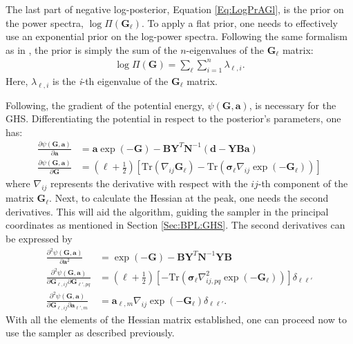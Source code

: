 \qquad The last part of negative log-posterior, Equation \eqref{Eq:LogPrAGl}, is the prior on the power spectra, $\log\Pi(\bm{G}_{\ell})$. To apply a flat prior, one needs to effectively use an exponential prior on the log-power spectra. Following the same formalism as in \cite{Taylor2008,SreeThesis}, the prior is simply the sum of the $n$-eigenvalues of the $\mathbf{G}_{\ell}$ matrix:
\begin{align}
\label{Eq:LogPiorGl}
\log\Pi(\mathbf{G}) = \sum_{\ell}\sum_{i=1}^n\lambda_{\ell,i}.
\end{align}
Here, $\lambda_{{\ell},i}$ is the \textit{i}-th eigenvalue of the $\mathbf{G}_{\ell}$ matrix.

\qquad Following, the gradient of the potential energy, $\psi(\mathbf{G},\mathbf{a})$, is necessary for the GHS. Differentiating the potential in respect to the posterior's parameters, one has:
\begin{align}
    \frac{\partial\psi(\mathbf{G},\mathbf{a})}{\partial\mathbf{a}} & = \mathbf{a}\exp(-\mathbf{G}) - \mathbf{B}\mathbf{Y}^T\mathbf{N}^{-1}(\mathbf{d}-\mathbf{Y}\mathbf{B}\mathbf{a}) \\
    \frac{\partial\psi(\mathbf{G},\mathbf{a})}{\partial\mathbf{G}} & = \left( {\ell}+\frac{1}{2}\right)\left[\mathrm{Tr}(\nabla_{ij}\mathbf{G}_{\ell}) -\mathrm{Tr}(\boldsymbol{\sigma}_{\ell}\nabla_{ij}\exp(-\mathbf{G}_{\ell})) \right]
\end{align}
where $\nabla_{ij}$ represents the derivative with respect with the $ij$-th component of the matrix $\mathbf{G}_{\ell}$. Next, to calculate the Hessian at the peak, one needs the second derivatives. This will aid the algorithm, guiding the sampler in the principal coordinates as mentioned in Section \ref{Sec:BPL:GHS}. The second derivatives can be expressed by
\begin{align}
    \frac{\partial^2\psi(\mathbf{G},\mathbf{a})}{\partial\mathbf{a}^2} & = \exp(-\mathbf{G}) - \mathbf{B}\mathbf{Y}^T\mathbf{N}^{-1}\mathbf{Y}\mathbf{B} \\\label{Eq:BPL:HessianAlms}
    \frac{\partial^2\psi(\mathbf{G},\mathbf{a})}{\partial\mathbf{G}_{\ell,ij}\partial\mathbf{G}_{\ell',pq}} & = \left( {\ell}+\frac{1}{2}\right)\left[-\mathrm{Tr}(\boldsymbol{\sigma}_{\ell}\nabla^2_{ij,pq} \exp(-\mathbf{G}_{\ell})) \right]\delta_{\ell\ell'} \\
    \frac{\partial^2\psi(\mathbf{G},\mathbf{a})}{\partial\mathbf{G}_{\ell,ij}\partial\mathbf{a}_{\ell',m}} & = \mathbf{a}_{\ell,m}\nabla_{ij}\exp(-\mathbf{G}_{\ell})\delta_{\ell\ell'}.\label{Eq:BPL:HessianOffDiag}
\end{align}
With all the elements of the Hessian matrix established, one can proceed now to use the sampler as described previously. 

